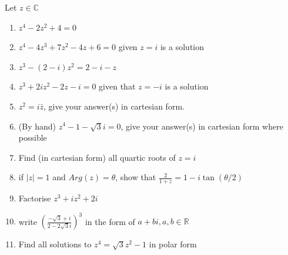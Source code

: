 \documentclass[12pt]{article}
\begin{document}
Let $z \in \mathbb{C}$
\begin{enumerate}
    \item $z^{4} - 2z^{2} + 4 =0$
    \vspace{2cm}
    \item $z^{4} - 4z^{3} + 7z^{2} - 4z + 6 = 0$ given $z = i$ is a solution 
    \vspace{3cm}
    \item $z^{3} - (2-i)z^{2} = 2-i-z$
    \vspace{3cm}
    \item $z^{3} + 2i z^{2} - 2z - i = 0$ given that $z = -i$ is a solution
    \vspace{3cm}
    \item $z^{2} = i \bar{z}$, give your answer(s) in cartesian form.
    \vspace{3cm}
    \item (By hand) $z^{4} -1 - \sqrt{3}i = 0$, give your answer(s) in cartesian form where possible
    \vspace{3cm}
    \item Find (in cartesian form) all quartic roots of $z = i$
    \vspace{3cm}
    \item if $|z| = 1$ and $Arg(z) = \theta $, show that $\frac{2}{1+z} = 1-i\tan(\theta /2)$
    \vspace{3cm}
    \item Factorise $z^{3} + i z^{2} + 2i$
    \vspace{3cm}
    \item write $\left(\frac{-\sqrt{3} + i}{2 - 2\sqrt{3}i}\right)^{3}$ in the form of $a + b i, a,b \in \mathbb{R}$
    \vspace{3cm}
    \item Find all solutions to $z^{4} = \sqrt{3}z^{2} -1 $ in polar form
\end{enumerate}
\end{document}
